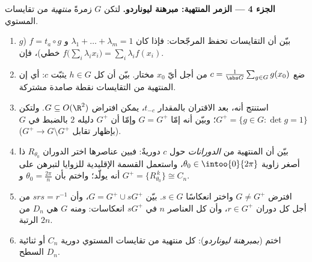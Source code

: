 \begin{problem}
\medskip
\noindent\textbf{الجزء 4 --- الزمر المنتهية: مبرهنة ليوناردو.}
لتكن $G$ زمرةً \emph{منتهية} من تقايسات المستوي.
\begin{enumerate}[resume]
  \item بيّن أن التقايسات تحفظ المرجّحات: فإذا كان
        $\lambda_1 + \dots + \lambda_m = 1$ و $f = t_a \circ
        g$ ($g$ خطي)، فإن $f\bigl(\sum_i \lambda_i
        x_i\bigr) = \sum_i \lambda_i f(x_i)$.
  \item ضع $c = \frac{1}{\abs G}\sum_{g \in G} g(x_0)$ من أجل أيّ
        $x_0$ مختار. بيّن أن كل $h \in G$ يثبّت $c$: أي إن
         المنتهية من التقايسات نقطة صامدة مشتركة.
  \item استنتج أنه، بعد الاقتران بالمقدار $t_{-c}$، يمكن
        افتراض $G \subseteq O(\R^2)$. ولتكن $G^{+} = \{g \in G :
        \det g = 1\}$؛ وبيّن أنه إمّا $G = G^{+}$ وإمّا أن $G^{+}$
        دليله $2$ بالضبط في $G$ (بإظهار تقابل $G^+
        \to G \setminus G^+$).
  \item بيّن أن  المنتهية من \emph{الدورانات} حول $c$
        دوريةٌ: فبين عناصرها اختر الدوران
        $R_{\theta_0}$ ذا أصغر زاوية $\theta_0 \in
        \intoo{0}{2\pi}$، واستعمل القسمة الإقليدية للزوايا
        لتبرهن على أنه يولّد؛ واختم بأن $\theta_0 =
        \frac{2\pi}n$ و $G^{+} = \{R_{\theta_0}^{\,k}\} \cong
        C_n$.
  \item افترض $G \neq G^{+}$ واختر انعكاسًا $s \in G$.
        بيّن $G = G^{+} \cup sG^{+}$، وأن $s r s = r^{-1}$ من أجل
        كل دوران $r \in G^{+}$، وأن كل العناصر $n$ في
        $sG^{+}$ انعكاسات: ومنه  $G$ هي \emph{} $D_n$ من الرتبة $2n$.
  \item اختم (\emph{بمبرهنة ليوناردو}): كل  منتهية
        من تقايسات المستوي دورية $C_n$ أو ثنائية السطح
        $D_n$.
\end{enumerate}


\end{problem}
